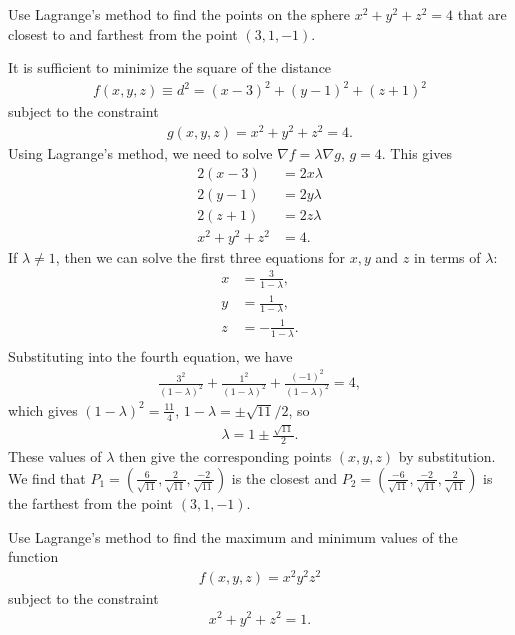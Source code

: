 \documentclass[12pt,letterpaper,reqno]{article}
\numberwithin{equation}{section}
\begin{document}
{\begin{exercise}
Use Lagrange's method to find the points on the sphere $x^2+y^2+z^2=4$ that are closest to and farthest from the point $(3,1,-1)$.	
\end{exercise}

{\color{red}
\begin{solution}
It is sufficient to minimize the square of the distance
\begin{align*}
	f(x,y,z)\equiv d^2=(x-3)^2+(y-1)^2+(z+1)^2
\end{align*}
subject to the constraint
\begin{align*}
	g(x,y,z)=x^2+y^2+z^2=4.
\end{align*}
Using Lagrange's method, we need to solve $\nabla f=\lambda \nabla g$, $g=4$. This gives
\begin{align*}
	2(x-3)&=2x\lambda \\
	2(y-1)&=2y\lambda \\
	2(z+1)&=2z\lambda \\
	x^2+y^2+z^2&=4.
\end{align*}
If $\lambda \neq 1$, then we can solve the first three equations for $x,y$ and $z$ in terms of $\lambda$:
\begin{align*}
	x&=\frac{3}{1-\lambda}, \\
	y&=\frac{1}{1-\lambda}, \\
	z&=-\frac{1}{1-\lambda}. \\
\end{align*}
Substituting into the fourth equation, we have
\begin{align*}
	\frac{3^2}{(1-\lambda)^2}+\frac{1^2}{(1-\lambda)^2}+\frac{(-1)^2}{(1-\lambda)^2}=4,
\end{align*}
which gives $(1-\lambda)^2=\frac{11}{4}$, $1-\lambda=\pm \sqrt{11}/2$, so
\begin{align*}
	\lambda=1\pm \frac{\sqrt{11}}{2}.
\end{align*}
These values of $\lambda$ then give the corresponding points $(x,y,z)$ by substitution. We find that
	$P_1=(\frac{6}{\sqrt{11}},\frac{2}{\sqrt{11}},\frac{-2}{\sqrt{11}})$ is the closest and $P_2=(\frac{-6}{\sqrt{11}},\frac{-2}{\sqrt{11}},\frac{2}{\sqrt{11}})$ is the farthest from the point $(3,1,-1)$.
\end{solution}}

\begin{exercise}
Use Lagrange's method to find the maximum and minimum values of the function
\begin{align*}
	f(x,y,z)=x^2y^2z^2
\end{align*}
subject to the constraint
\begin{align*}
	x^2+y^2+z^2=1.
\end{align*}
\end{exercise}

}
\end{document}
